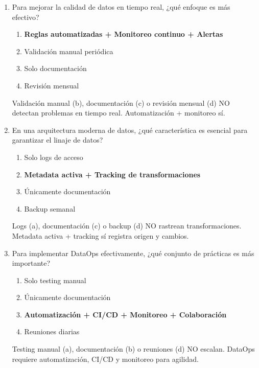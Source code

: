 \documentclass[12pt]{article}
\begin{document}
\begin{enumerate}[label=\arabic*.]
\item Para mejorar la calidad de datos en tiempo real, ¿qué enfoque es más efectivo?
\begin{enumerate}
    \item \textbf{Reglas automatizadas + Monitoreo continuo + Alertas}
    \item Validación manual periódica
    \item Solo documentación
    \item Revisión mensual
\end{enumerate}
Validación manual (b), documentación (c) o revisión mensual (d) NO detectan problemas en tiempo real. Automatización + monitoreo sí.

\item En una arquitectura moderna de datos, ¿qué característica es esencial para garantizar el linaje de datos?
\begin{enumerate}
    \item Solo logs de acceso
    \item \textbf{Metadata activa + Tracking de transformaciones}
    \item Únicamente documentación
    \item Backup semanal
\end{enumerate}
Logs (a), documentación (c) o backup (d) NO rastrean transformaciones. Metadata activa + tracking sí registra origen y cambios.

\item Para implementar DataOps efectivamente, ¿qué conjunto de prácticas es más importante?
\begin{enumerate}
    \item Solo testing manual
    \item Únicamente documentación
    \item \textbf{Automatización + CI/CD + Monitoreo + Colaboración}
    \item Reuniones diarias
\end{enumerate}
Testing manual (a), documentación (b) o reuniones (d) NO escalan. DataOps requiere automatización, CI/CD y monitoreo para agilidad.

\end{enumerate}
\end{document}

